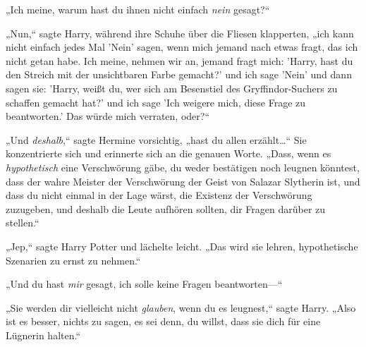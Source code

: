 „Ich meine, warum hast du ihnen nicht einfach \emph{nein} gesagt?“

„Nun,“ sagte Harry, während ihre Schuhe über die Fliesen klapperten, „ich kann nicht einfach jedes Mal 'Nein' sagen, wenn mich jemand nach etwas fragt, das ich nicht getan habe. Ich meine, nehmen wir an, jemand fragt mich: 'Harry, hast du den Streich mit der unsichtbaren Farbe gemacht?' und ich sage 'Nein' und dann sagen sie: 'Harry, weißt du, wer sich am Besenstiel des Gryffindor-Suchers zu schaffen gemacht hat?' und ich sage 'Ich weigere mich, diese Frage zu beantworten.' Das würde mich verraten, oder?“

„Und \emph{deshalb},“ sagte Hermine vorsichtig, „hast du allen erzählt…“ Sie konzentrierte sich und erinnerte sich an die genauen Worte. „Dass, wenn es \emph{hypothetisch} eine Verschwörung gäbe, du weder bestätigen noch leugnen könntest, dass der wahre Meister der Verschwörung der Geist von Salazar Slytherin ist, und dass du nicht einmal in der Lage wärst, die Existenz der Verschwörung zuzugeben, und deshalb die Leute aufhören sollten, dir Fragen darüber zu stellen.“

„Jep,“ sagte Harry Potter und lächelte leicht. „Das wird sie lehren, hypothetische Szenarien zu ernst zu nehmen.“

„Und du hast \emph{mir} gesagt, ich solle keine Fragen beantworten—“

„Sie werden dir vielleicht nicht \emph{glauben}, wenn du es leugnest,“ sagte Harry. „Also ist es besser, nichts zu sagen, es sei denn, du willst, dass sie dich für eine Lügnerin halten.“

